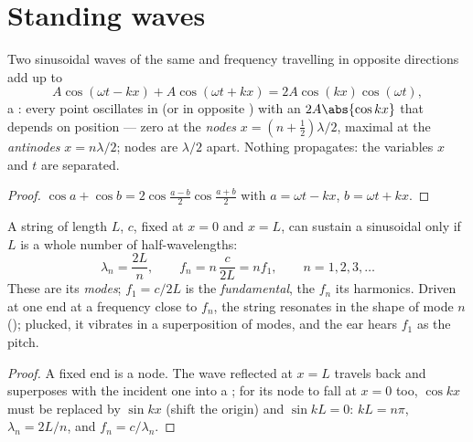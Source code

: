 \section{Standing waves}

\begin{theorem}\label{thm:b1:wave-propagation:standing}
Two sinusoidal waves of the same  and frequency travelling in
opposite directions add up to
\[
A\cos(\omega t - kx) + A\cos(\omega t + kx) = 2A\cos(kx)\cos(\omega t),
\]
a \emph{}: every point oscillates in  (or in opposite
) with an  $2A\abs{\cos kx}$ that depends on position ---
zero at the \emph{nodes} $x = (n + \tfrac12)\lambda/2$, maximal at the
\emph{antinodes} $x = n\lambda/2$; nodes are $\lambda/2$ apart. Nothing
propagates: the variables $x$ and $t$ are separated.
\end{theorem}

\begin{proof}
$\cos a + \cos b = 2\cos\frac{a - b}{2}\cos\frac{a + b}{2}$ with
$a = \omega t - kx$, $b = \omega t + kx$.
\end{proof}

\begin{proposition}\label{prop:b1:wave-propagation:modes}
A string of length $L$,  $c$, fixed at $x = 0$ and $x = L$, can
sustain a sinusoidal  only if $L$ is a whole number of
half-wavelengths:
\[
\lambda_n = \frac{2L}{n}, \qquad f_n = n\,\frac{c}{2L} = n f_1,
\qquad n = 1, 2, 3, \dots
\]
These are its \emph{modes}; $f_1 = c/2L$ is the \emph{fundamental},
the $f_n$ its harmonics. Driven at one end at a frequency close to
$f_n$, the string resonates in the shape of mode $n$ (); plucked, it vibrates in a superposition of modes, and the
ear hears $f_1$ as the pitch.
\end{proposition}

\begin{proof}
A fixed end is a node. The wave reflected at $x = L$ travels back and
superposes with the incident one into a ; for its node to
fall at $x = 0$ too, $\cos kx$ must be replaced by $\sin kx$ (shift
the origin) and $\sin kL = 0$: $kL = n\pi$, $\lambda_n = 2L/n$, and
$f_n = c/\lambda_n$.
\end{proof}

